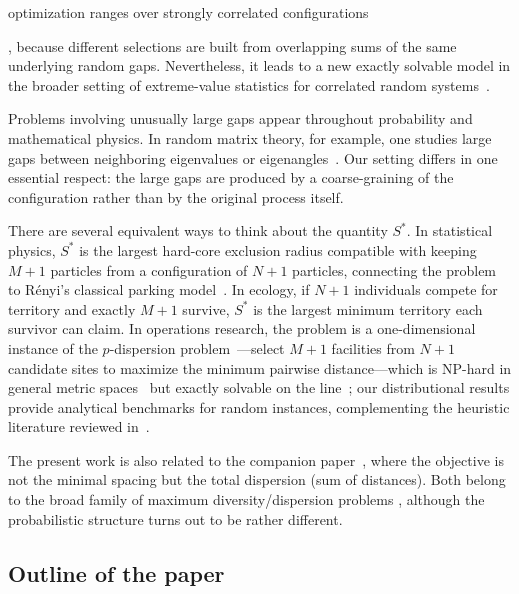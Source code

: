 \documentclass[a4paper,reqno,11pt]{amsart}
\numberwithin{equation}{section}
\numberwithin{thm}{section}
\theoremstyle{plain}
\theoremstyle{definition}
\begin{document}
optimization ranges over strongly correlated configurations{, because different selections are built from overlapping sums of the same underlying random gaps. Nevertheless, it leads to a new
exactly solvable model in the broader setting of extreme-value statistics for
correlated random systems~\cite{MajumdarSchehr2024,SchehrMajumdar2012,MajumdarMounaixSchehr2013}. 

Problems involving unusually large gaps appear throughout probability and
mathematical physics.  In random matrix theory, for example, one studies large
gaps between neighboring eigenvalues or eigenangles~\cite{BenArousBourgade2013,FengWei2025,Dyson1962}. Our setting differs in one
essential respect: the large gaps are produced by a coarse-graining of the
configuration rather than by the original process itself.

There are several equivalent ways to think about the quantity $S^*$.
In statistical physics, $S^*$ is the largest hard-core exclusion radius
compatible with keeping $M+1$ particles from a configuration of $N+1$ {particles},
connecting the problem to R\'enyi's classical parking model~\cite{Renyi1958}.
In ecology, if $N+1$ individuals compete for territory and exactly $M+1$
survive, $S^*$ is the largest minimum territory each survivor can claim.
In operations research, the problem is a one-dimensional instance of the
$p$-dispersion problem~\cite{Kuby1987,ErkutNeuman1989,RaviRossSchneider1994}---select
$M+1$ facilities from $N+1$ candidate sites to maximize the minimum pairwise
distance---which is NP-hard in general metric spaces{~\cite{Erkut1990,SayahIrnich2017,FrancoUchoa2015}} but exactly solvable on
the line{~\cite{RaviRossSchneider1994,AkagiEtAl2018,araki2022max}}; our distributional results provide analytical benchmarks for random
instances, complementing the heuristic literature reviewed in~\cite{MartiEtal2022}.

The present work is also related to the companion paper~\cite{CCGV2026}, where
the objective is not the minimal spacing but the total dispersion (sum of distances). Both belong
to the broad family of maximum diversity/dispersion problems
\cite{FernandezEtal2013,MazzarasiEtal2021,MartiEtal2022}, although the probabilistic structure
turns out to be rather different.



\subsection{Outline of the paper}

}
\end{document}

